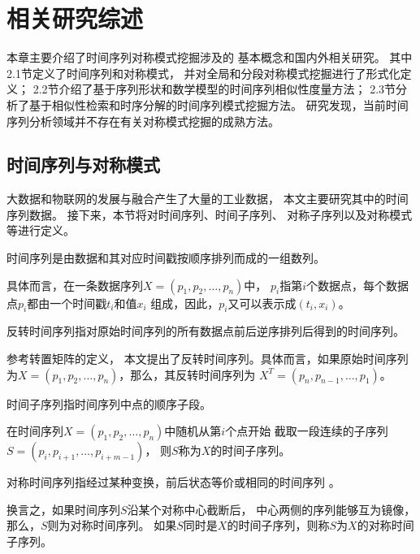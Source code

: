 
\chapter{相关研究综述}
本章主要介绍了时间序列对称模式挖掘涉及的
基本概念和国内外相关研究。
其中2.1节定义了时间序列和对称模式，
并对全局和分段对称模式挖掘进行了形式化定义；
2.2节介绍了基于序列形状和数学模型的时间序列相似性度量方法；
2.3节分析了基于相似性检索和时序分解的时间序列模式挖掘方法。
研究发现，当前时间序列分析领域并不存在有关对称模式挖掘的成熟方法。

\section{时间序列与对称模式}
大数据和物联网的发展与融合产生了大量的工业数据，
本文主要研究其中的时间序列数据。
接下来，本节将对时间序列、时间子序列、
对称子序列以及对称模式等进行定义。

\begin{definition}
  时间序列是由数据和其对应时间戳按顺序排列而成的一组数列\cite{DBLP:journals/csur/EslingA12}。

  具体而言，在一条数据序列$X = \left( p_1,p_2,\dots,p_n \right)$中，
  $p_i$指第$i$个数据点，每个数据点$p_i$都由一个时间戳$t_i$和值$x_i$
  组成，因此，$p_i$又可以表示成$\left( t_i,x_i \right)$。
\end{definition}

\begin{definition}
  反转时间序列指对原始时间序列的所有数据点前后逆序排列后得到的时间序列。

  参考转置矩阵的定义\cite{DBLP:conf/vecpar/HishinumaHT16}，
  本文提出了反转时间序列。具体而言，如果原始时间序列
  为$X = \left( p_1,p_2,\dots,p_n \right)$，那么，其反转时间序列为
  $X^T = \left( p_n,p_{n-1},\dots,p_1 \right)$。
\end{definition}

\begin{definition}
  时间子序列指时间序列中点的顺序子段\cite{DBLP:conf/pakdd/LinM10}。

  在时间序列$X=\left( p_1,p_2,\dots,p_n \right)$中随机从第$i$个点开始
  截取一段连续的子序列$S = \left( p_i,p_{i+1},\dots,p_{i+m-1} \right)$，
  则$S$称为$X$的时间子序列。 
\end{definition}

\begin{definition}
  对称时间序列指经过某种变换，前后状态等价或相同的时间序列
  \cite{DBLP:journals/pami/NackmanP85}。

  换言之，如果时间序列$S$沿某个对称中心截断后，
  中心两侧的序列能够互为镜像，那么，$S$则为对称时间序列。
  如果$S$同时是$X$的时间子序列，则称$S$为$X$的对称时间子序列。
\end{definition}

